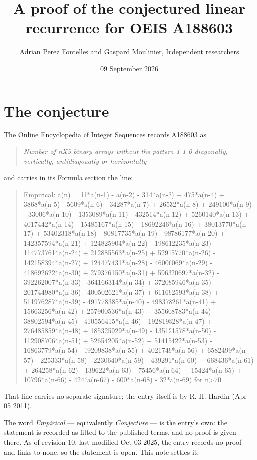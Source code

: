 \documentclass[11pt]{article}
\title{A proof of the conjectured linear recurrence for OEIS A188603}
\author{Adrian Perez Fontelles and Gaspard Moulinier, Independent researchers}
\date{09 September 2026}
\theoremstyle{definition}
\begin{document}
\maketitle
\section{The conjecture}

The Online Encyclopedia of Integer Sequences records \href{https://oeis.org/A188603}{A188603} as

\begin{quote}\itshape Number of nX5 binary arrays without the pattern 1 1 0 diagonally, vertically, antidiagonally or horizontally\end{quote}

and carries in its Formula section the line:

\begin{quote}\ttfamily Empirical: a(n) = 11*a(n-1) - a(n-2) - 314*a(n-3) + 475*a(n-4) + 3868*a(n-5) - 5609*a(n-6) - 34287*a(n-7) + 26532*a(n-8) + 249100*a(n-9) - 33006*a(n-10) - 1353089*a(n-11) - 432514*a(n-12) + 5260140*a(n-13) + 4017442*a(n-14) - 15485167*a(n-15) - 18692246*a(n-16) + 38013770*a(n-17) + 53402318*a(n-18) - 80817735*a(n-19) - 98786177*a(n-20) + 142357594*a(n-21) + 124825904*a(n-22) - 198612235*a(n-23) - 114773761*a(n-24) + 212885563*a(n-25) + 52915770*a(n-26) - 142158394*a(n-27) + 124477431*a(n-28) - 46006069*a(n-29) - 418692622*a(n-30) + 279376150*a(n-31) + 596320697*a(n-32) - 392262007*a(n-33) - 364166314*a(n-34) + 372085946*a(n-35) - 201744980*a(n-36) - 400502621*a(n-37) + 611692593*a(n-38) + 511976287*a(n-39) - 491778385*a(n-40) - 498378261*a(n-41) + 15663256*a(n-42) + 257900536*a(n-43) + 355608783*a(n-44) + 38802594*a(n-45) - 410556415*a(n-46) - 192819828*a(n-47) + 276485859*a(n-48) + 185325929*a(n-49) - 135121578*a(n-50) - 112908706*a(n-51) + 52654205*a(n-52) + 51415422*a(n-53) - 16863779*a(n-54) - 19209838*a(n-55) + 4021749*a(n-56) + 6582499*a(n-57) - 225333*a(n-58) - 2230640*a(n-59) - 439291*a(n-60) + 668436*a(n-61) + 264258*a(n-62) - 139622*a(n-63) - 75456*a(n-64) + 15424*a(n-65) + 10796*a(n-66) - 424*a(n-67) - 600*a(n-68) - 32*a(n-69) for n>70\end{quote}

That line carries no separate signature; the entry itself is by R. H. Hardin (Apr 05 2011).

The word {\itshape Empirical} --- equivalently {\itshape Conjecture} --- is the entry's own: the statement is recorded as fitted to the published terms, and no proof is given there. As of revision 10, last modified Oct 03 2025, the entry records no proof and links to none, so the statement is open. This note settles it.
\end{document}
